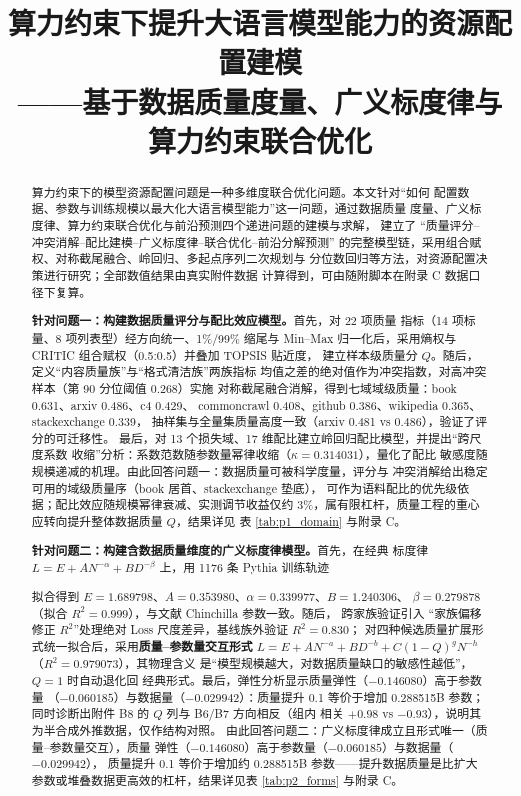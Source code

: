 \documentclass[bwprint]{gmcmthesis}
\title{算力约束下提升大语言模型能力的资源配置建模\\ ——基于数据质量度量、广义标度律与算力约束联合优化}
\begin{document}
\maketitle

\begin{abstract}
\begingroup\linespread{1.22}\selectfont

算力约束下的模型资源配置问题是一种多维度联合优化问题。本文针对``如何
配置数据、参数与训练规模以最大化大语言模型能力''这一问题，通过数据质量
度量、广义标度律、算力约束联合优化与前沿预测四个递进问题的建模与求解，
建立了
``质量评分--冲突消解--配比建模--广义标度律--联合优化--前沿分解预测''
的完整模型链，采用组合赋权、对称截尾融合、岭回归、多起点序列二次规划与
分位数回归等方法，对资源配置决策进行研究；全部数值结果由真实附件数据
计算得到，可由随附脚本在附录 C 数据口径下复算。

\textbf{针对问题一：构建数据质量评分与配比效应模型。}首先，对 22 项质量
指标（14 项标量、8 项列表型）经方向统一、1\%/99\% 缩尾与 Min--Max
归一化后，采用熵权与 CRITIC 组合赋权（0.5:0.5）并叠加 TOPSIS 贴近度，
建立样本级质量分 $Q$。随后，定义``内容质量族''与``格式清洁族''两族指标
均值之差的绝对值作为冲突指数，对高冲突样本（第 90 分位阈值 0.268）实施
对称截尾融合消解，得到七域域级质量：book 0.631、arxiv 0.486、c4 0.429、
commoncrawl 0.408、github 0.386、wikipedia 0.365、stackexchange 0.339，
抽样集与全量集质量高度一致（arxiv 0.481 vs 0.486），验证了评分的可迁移性。
最后，对 13 个损失域、17 维配比建立岭回归配比模型，并提出``跨尺度系数
收缩''分析：系数范数随参数量幂律收缩（$\kappa=0.314031$），量化了配比
敏感度随规模递减的机理。由此回答问题一：数据质量可被科学度量，评分与
冲突消解给出稳定可用的域级质量序（book 居首、stackexchange 垫底），
可作为语料配比的优先级依据；配比效应随规模幂律衰减、实测调节收益仅约
3\%，属有限杠杆，质量工程的重心应转向提升整体数据质量 $Q$，结果详见
表 \ref{tab:p1_domain} 与附录 C。

\textbf{针对问题二：构建含数据质量维度的广义标度律模型。}首先，在经典
标度律 $L=E+A N^{-\alpha}+B D^{-\beta}$ 上，用 1176 条 Pythia 训练轨迹
\begin{sloppypar}%
拟合得到 $E=1.689798$、$A=0.353980$、$\alpha=0.339977$、$B=1.240306$、
$\beta=0.279878$（拟合 $R^2=0.999$），与文献 Chinchilla 参数一致。随后，
跨家族验证引入
``家族偏移修正 $R^2$''处理绝对 Loss 尺度差异，基线族外验证 $R^2=0.830$；
对四种候选质量扩展形式统一拟合后，采用\textbf{质量--参数量交互形式}
$L=E+A N^{-a}+B D^{-b}+C(1-Q)^{g}N^{-h}$（$R^2=0.979073$），其物理含义
是``模型规模越大，对数据质量缺口的敏感性越低''，$Q=1$ 时自动退化回
经典形式。最后，弹性分析显示质量弹性（$-0.146080$）高于参数量
（$-0.060185$）与数据量（$-0.029942$）：质量提升 0.1 等价于增加
0.288515B 参数；同时诊断出附件 B8 的 $Q$ 列与 B6/B7 方向相反（组内
相关 $+0.98$ vs $-0.93$），说明其为半合成外推数据，仅作结构对照。
由此回答问题二：广义标度律成立且形式唯一（质量--参数量交互），质量
弹性（$-0.146080$）高于参数量（$-0.060185$）与数据量（$-0.029942$），
质量提升 0.1 等价于增加约 0.288515B 参数——提升数据质量是比扩大
参数或堆叠数据更高效的杠杆，结果详见表 \ref{tab:p2_forms} 与附录 C。
\end{sloppypar}


\end{abstract}
\end{document}
